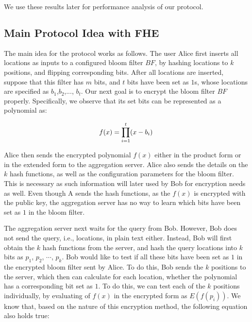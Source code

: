 

We use these results later for performance analysis of our protocol.

\subsection{Main Protocol Idea with FHE}

The main idea for the protocol works as follows. The user Alice first inserts all locations as inputs to a configured bloom filter $BF$, by hashing locations to $k$ positions, and flipping corresponding bits. After all locations are inserted, suppose that this filter has $m$ bits, and $t$ bits have been set as $1$s, whose locations are specified as $b_1$,$b_2$,..., $b_t$. Our next goal is to encrypt the bloom filter $BF$ properly. Specifically, we observe that its set bits can be represented as a polynomial as:

\begin{equation}
\vspace{-0.1in}
f(x) = \prod_{i=1}^{t} (x-b_i)
\end{equation}

Alice then sends the encrypted polynomial $f(x)$ either in the product form or in the extended form to the aggregation server. Alice also sends the details on the $k$ hash functions, as well as the configuration parameters for the bloom filter. This is necessary as such information will later used by Bob for encryption needs as well. Even though A sends the hash functions, as the $f(x)$ is encrypted with the public key, the aggregation server has no way to learn which bits have been set as $1$ in the bloom filter.

The aggregation server next waits for the query from Bob. However, Bob does not send the query, i.e., locations, in plain text either. Instead, Bob will first obtain the $k$ hash functions from the server, and hash the query locations into $k$ bits as $p_1$, $p_2$, $\cdots$, $p_k$. Bob would like to test if all these bits have been set as $1$ in the encrypted bloom filter sent by Alice. To do this, Bob sends the $k$ positions to the server, which then can calculate for each location, whether the polynomial has a corresponding bit set as $1$. To do this, we can test each of the $k$ positions individually, by evaluating of $f(x)$ in the encrypted form as $E(f(p_i))$. We know that, based on the nature of this encryption method, the following equation also holds true:

